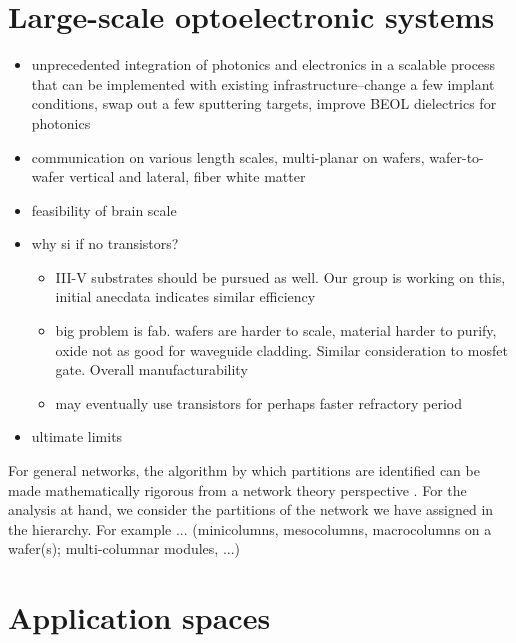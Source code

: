 \documentclass[twocolumn]{article}
\begin{document}
\section{\label{sec:scaling}Large-scale optoelectronic systems}

\begin{itemize}
\item unprecedented integration of photonics and electronics in a scalable process that can be implemented with existing infrastructure--change a few implant conditions, swap out a few sputtering targets, improve BEOL dielectrics for photonics
\item communication on various length scales, multi-planar on wafers, wafer-to-wafer vertical and lateral, fiber white matter
\item feasibility of brain scale
\item why si if no transistors?
\begin{itemize}
\item III-V substrates should be pursued as well. Our group is working on this, initial anecdata indicates similar efficiency
\item big problem is fab. wafers are harder to scale, material harder to purify, oxide not as good for waveguide cladding. Similar consideration to mosfet gate. Overall manufacturability
\item may eventually use transistors for perhaps faster refractory period
\end{itemize}
\item ultimate limits
\end{itemize}


For general networks, the algorithm by which partitions are identified can be made mathematically rigorous from a network theory perspective \cite{oz1992,oz2004}. For the analysis at hand, we consider the partitions of the network we have assigned in the hierarchy. For example ... (minicolumns, mesocolumns, macrocolumns on a wafer(s); multi-columnar modules, ...) 

\section{\label{sec:applications}Application spaces}
\end{document}
